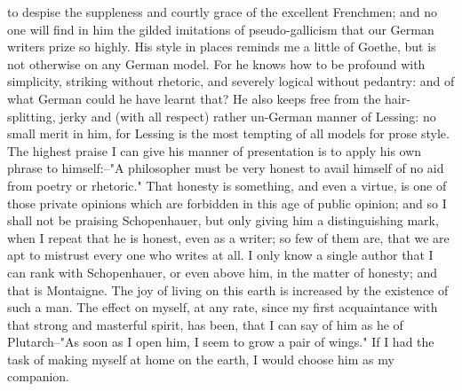 to despise the suppleness and courtly grace of the excellent
Frenchmen; and no one will find in him the gilded imitations of
pseudo-gallicism that our German writers prize so highly. His style
in places reminds me a little of Goethe, but is not otherwise on any
German model. For he knows how to be profound with simplicity,
striking without rhetoric, and severely logical without pedantry: and
of what German could he have learnt that? He also keeps free from the
hair-splitting, jerky and (with all respect) rather un-German manner
of Lessing: no small merit in him, for Lessing is the most tempting
of all models for prose style. The highest praise I can give his
manner of presentation is to apply his own phrase to himself:--"A
philosopher must be very honest to avail himself of no aid from
poetry or rhetoric." That honesty is something, and even a virtue, is
one of those private opinions which are forbidden in this age of
public opinion; and so I shall not be praising Schopenhauer, but only
giving him a distinguishing mark, when I repeat that he is honest,
even as a writer; so few of them are, that we are apt to mistrust
every one who writes at all. I only know a single author that I can
rank with Schopenhauer, or even above him, in the matter of honesty;
and that is Montaigne. The joy of living on this earth is increased
by the existence of such a man. The effect on myself, at any rate,
since my first acquaintance with that strong and masterful spirit,
has been, that I can say of him as he of Plutarch--"As soon as I open
him, I seem to grow a pair of wings." If I had the task of making
myself at home on the earth, I would choose him as my companion.

